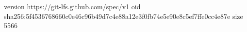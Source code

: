 version https://git-lfs.github.com/spec/v1
oid sha256:5f4536768660c0e46c96b49d7c4e88a12e3f0fb74e5e90e8c5ef7ffe0cc4e87e
size 5566
